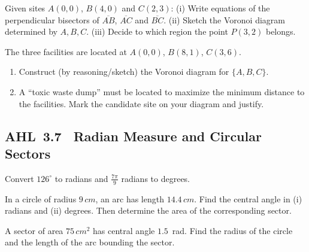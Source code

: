 \documentclass[11pt]{article}
\def\mathrm#1{#1}%
\newcommand{\tocsubsection}[1]{\subsection{#1}}
\newcounter{question}
\begin{document}
\begin{question}
Given sites $A(0,0)$, $B(4,0)$ and $C(2,3)$:
(i) Write equations of the perpendicular bisectors of $\overline{AB}$, $\overline{AC}$ and $\overline{BC}$.
(ii) Sketch the Voronoi diagram determined by $A,B,C$.
(iii) Decide to which region the point $P(3,2)$ belongs.
\end{question}


\begin{question}
 The three facilities are located at $A(0,0)$, $B(8,1)$, $C(3,6)$. 
\begin{enumerate}
  \item Construct (by reasoning/sketch) the Voronoi diagram for $\{A,B,C\}$.
  \item A “toxic waste dump” must be located to maximize the minimum distance to the facilities. Mark the candidate site on your diagram and justify.
\end{enumerate}
\begin{center}
\end{center}
\end{question}


\tocsubsection{AHL 3.7 \; Radian Measure and Circular Sectors}

\begin{question}
Convert $126^{\circ}$ to radians and $\tfrac{7\pi}{9}$ radians to degrees.
\end{question}

\begin{question}
In a circle of radius $9\,\mathrm{cm}$, an arc has length $14.4\,\mathrm{cm}$.
Find the central angle in (i) radians and (ii) degrees.  Then determine the
area of the corresponding sector.
\end{question}

\begin{question}
A sector of area $75\,\mathrm{cm}^2$ has central angle $1.5$~rad.
Find the radius of the circle and the length of the arc bounding the sector.
\end{question}
\end{document}
